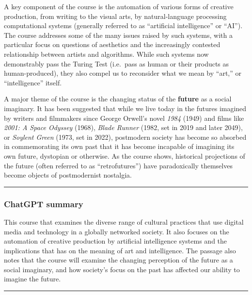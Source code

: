 \documentclass[
  letterpaper,
  DIV=11,
  numbers=noendperiod]{scrartcl}
\begin{document}
A key component of the course is the automation of various forms of
creative production, from writing to the visual arts, by
natural-language processing computational systems (generally referred to
as ``artificial intelligence'' or ``AI''). The course addresses some of
the many issues raised by such systems, with a particular focus on
questions of aesthetics and the increasingly contested relationship
between artists and algorithms. While such systems now demonstrably pass
the Turing Test (i.e.~pass as human or their products as
human-produced), they also compel us to reconsider what we mean by
``art,'' or ``intelligence'' itself.

A major theme of the course is the changing status of the
\textbf{future} as a social imaginary. It has been suggested that while
we live today in the futures imagined by writers and filmmakers since
George Orwell's novel \emph{1984} (1949) and films like \emph{2001: A
Space Odyssey} (1968), \emph{Blade Runner} (1982, set in 2019 and later
2049), or \emph{Soylent Green} (1973, set in 2022), postmodern society
has become so absorbed in commemorating its own past that it has become
incapable of imagining its own future, dystopian or otherwise. As the
course shows, historical projections of the future (often referred to as
``retrofutures'') have paradoxically themselves become objects of
postmodernist nostalgia.

\begin{center}\rule{0.5\linewidth}{0.5pt}\end{center}

\hypertarget{chatgpt-summary}{%
\subsubsection{ChatGPT summary}\label{chatgpt-summary}}

This course that examines the diverse range of cultural practices that
use digital media and technology in a globally networked society. It
also focuses on the automation of creative production by artificial
intelligence systems and the implications that has on the meaning of art
and intelligence. The passage also notes that the course will examine
the changing perception of the future as a social imaginary, and how
society's focus on the past has affected our ability to imagine the
future.

\begin{center}\rule{0.5\linewidth}{0.5pt}\end{center}
\end{document}
